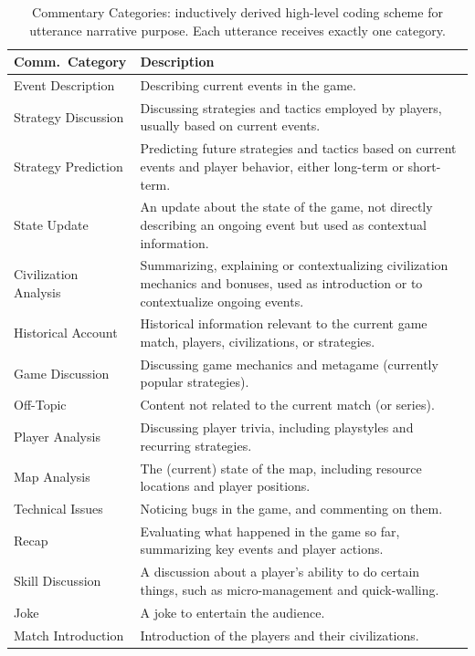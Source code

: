 \begin{table}[htbp]
  \caption{Commentary Categories: inductively derived high-level coding scheme for utterance narrative purpose. Each utterance receives exactly one category.}
  \centering
  \setlength{\tabcolsep}{3pt}
  \renewcommand{\arraystretch}{1.5}
  \begin{tabularx}{\textwidth}{@{}>{\raggedright\arraybackslash}p{3.5cm}>{\raggedright\arraybackslash}p{12cm}@{}}
    \toprule
    \textbf{Comm.\ Category}  & \textbf{Description} \\
    \midrule
    Event Description      & Describing current events in the game. \\
    Strategy Discussion    & Discussing strategies and tactics employed by players, usually based on current events. \\
    Strategy Prediction    & Predicting future strategies and tactics based on current events and player behavior, either long-term or short-term. \\
    State Update           & An update about the state of the game, not directly describing an ongoing event but used as contextual information. \\
    Civilization Analysis  & Summarizing, explaining or contextualizing civilization mechanics and bonuses, used as introduction or to contextualize ongoing events. \\
    Historical Account     & Historical information relevant to the current game match, players, civilizations, or strategies. \\
    Game Discussion        & Discussing game mechanics and metagame (currently popular strategies). \\
    Off-Topic              & Content not related to the current match (or series). \\
    Player Analysis        & Discussing player trivia, including playstyles and recurring strategies. \\
    Map Analysis           & The (current) state of the map, including resource locations and player positions. \\
    Technical Issues       & Noticing bugs in the game, and commenting on them. \\
    Recap                  & Evaluating what happened in the game so far, summarizing key events and player actions. \\
    Skill Discussion       & A discussion about a player's ability to do certain things, such as micro-management and quick-walling. \\
    Joke                   & A joke to entertain the audience. \\
    Match Introduction     & Introduction of the players and their civilizations. \\
    \bottomrule
  \end{tabularx}
  \label{tab:communication-intents-descriptions}
\end{table}


